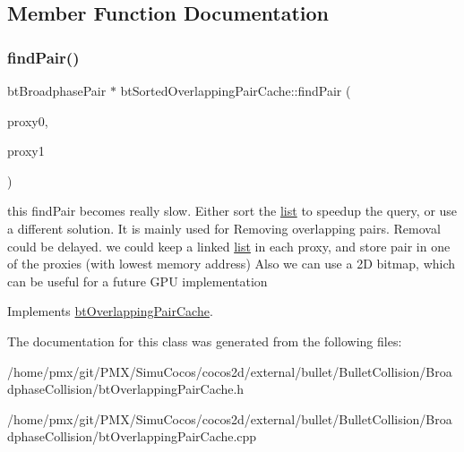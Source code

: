 \subsection{Member Function Documentation}
\mbox{\label{classbtSortedOverlappingPairCache_a73b6665ffd9874f0575b72d07761ce8d}} 
\subsubsection{\texorpdfstring{find\+Pair()}{findPair()}}
{\footnotesize\ttfamily bt\+Broadphase\+Pair $\ast$ bt\+Sorted\+Overlapping\+Pair\+Cache\+::find\+Pair (\begin{DoxyParamCaption}\item[{bt\+Broadphase\+Proxy $\ast$}]{proxy0,  }\item[{bt\+Broadphase\+Proxy $\ast$}]{proxy1 }\end{DoxyParamCaption})\hspace{0.3cm}{\ttfamily [virtual]}}

this find\+Pair becomes really slow. Either sort the \hyperlink{protocollist-p}{list} to speedup the query, or use a different solution. It is mainly used for Removing overlapping pairs. Removal could be delayed. we could keep a linked \hyperlink{protocollist-p}{list} in each proxy, and store pair in one of the proxies (with lowest memory address) Also we can use a 2D bitmap, which can be useful for a future G\+PU implementation 

Implements \hyperlink{classbtOverlappingPairCache}{bt\+Overlapping\+Pair\+Cache}.



The documentation for this class was generated from the following files\+:\begin{DoxyCompactItemize}
\item 
/home/pmx/git/\+P\+M\+X/\+Simu\+Cocos/cocos2d/external/bullet/\+Bullet\+Collision/\+Broadphase\+Collision/bt\+Overlapping\+Pair\+Cache.\+h\item 
/home/pmx/git/\+P\+M\+X/\+Simu\+Cocos/cocos2d/external/bullet/\+Bullet\+Collision/\+Broadphase\+Collision/bt\+Overlapping\+Pair\+Cache.\+cpp\end{DoxyCompactItemize}
